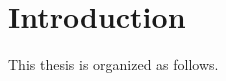 \chapter{Introduction}
\label{Introduction}
\thispagestyle{empty}

\vspace{0.5cm}






This thesis is organized as follows. 